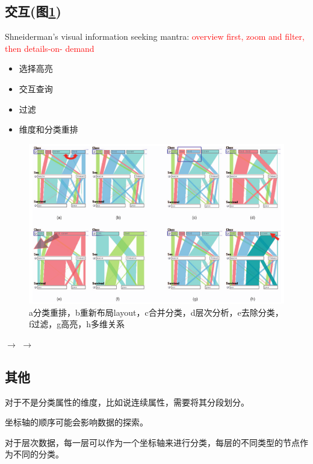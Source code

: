 \documentclass{article}
\begin{document}
	\subsection{交互(图\ref{fig:parallelcoordinates2})}
	\begin{framed}
		Shneiderman’s visual information seeking mantra:
		\textcolor{red}{overview first, zoom and filter, then details-on- demand}
	\end{framed}
	\begin{itemize}
		\item 选择高亮
		\item 交互查询
		\item 过滤
		\item 维度和分类重排
	\end{itemize}
	\begin{figure}[h]
		\centering
		\includegraphics[width=\textwidth]{"_img/Parallel_Coordinates_2.png"}
		\caption{a分类重排，b重新布局layout，c合并分类，d层次分析，e去除分类，f过滤，g高亮，h多维关系}
		\label{fig:parallelcoordinates2}
	\end{figure}

	$\longrightarrow$
	$\longrightarrow$

	\subsection{其他}
	对于不是分类属性的维度，比如说连续属性，需要将其分段划分。

	坐标轴的顺序可能会影响数据的探索。

	对于层次数据，每一层可以作为一个坐标轴来进行分类，每层的不同类型的节点作为不同的分类。
\end{document}
